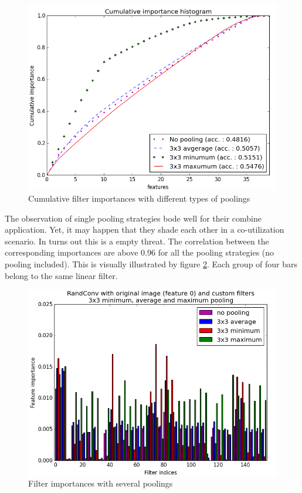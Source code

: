 \documentclass[a4paper]{report}
\begin{document}
	
	\begin{figure}
		\centering
			\includegraphics[width=1.0\textwidth]{images/FIPoolCumul.png}
		\caption{\label{fig:FIPoolCumul}Cumulative filter importances with different types of poolings}
	\end{figure}
	
	\par
	The observation of single pooling strategies bode well for their combine application. Yet, it may happen that they shade each other in a co-utilization scenario. In turns out this is a empty threat. The correlation between the corresponding importances are above 0.96 for all the pooling strategies (no pooling included). This is visually illustrated by figure \ref{fig:FIPoolNoAvgMinMax}. Each group of four bars belong to the same linear filter. 
	
	\begin{figure}
		\centering
			\includegraphics[width=1.0\textwidth]{images/FIPoolNoAvgMinMax.png}
		\caption{\label{fig:FIPoolNoAvgMinMax}Filter importances with several poolings}
	\end{figure}
	
\end{document}
